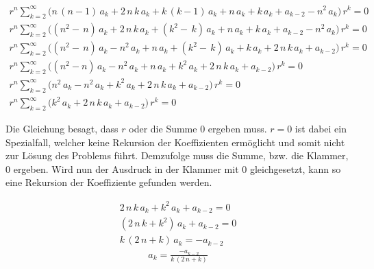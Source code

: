 \begin{align}
	r^n
	\sum_{k=2}^{\infty}
	\biggl(
	n \, \left( n - 1 \right) \, a_k 
	+
	2 \, n \, k \, a_k
	+
	k \, \left( k - 1 \right) \, a_k
	+
	n \, a_k
	+
	k \, a_k
	+
	a_{k - 2}
	-
	n^2 \, a_k
	\biggr)
	\, r^k
	= 0 
	\label{eq:bessel:summe:zusammengefasst}
	\\
	\nonumber
	r^n
	\sum_{k=2}^{\infty}
	\biggl(
	\left( n^2 - \, n \right) \, a_k 
	+
	2 \, n \, k \, a_k
	+
	\left( k^2 - \, k \right) \, a_k
	+
	n \, a_k
	+
	k \, a_k
	+
	a_{k - 2}
	-
	n^2 \, a_k
	\biggr)
	\, r^k
	= 0 
	\\
	\nonumber
	r^n
	\sum_{k=2}^{\infty}
	\biggl(
	\left( n^2 - \, n \right) \, a_k 
	-
	n^2 \, a_k
	+
	n \, a_k
	+
	\left( k^2 - \, k \right) \, a_k
	+
	k \, a_k
	+
	2 \, n \, k \, a_k
	+
	a_{k - 2}
	\biggr)
	\, r^k
	= 0 
	\\
	\nonumber
	r^n
	\sum_{k=2}^{\infty}
	\biggl(
	\left( n^2 - n \right) \, a_k 
	-
	n^2 \, a_k
	+
	n \, a_k
	+
	k^2 \, a_k
	+
	2 \, n \, k \, a_k
	+
	a_{k - 2}
	\biggr)
	\, r^k
	= 0 
	\\
	\nonumber
	r^n
	\sum_{k=2}^{\infty}
	\biggl(
	n^2 \, a_k 
	-
	n^2 \, a_k
	+
	k^2 \, a_k
	+
	2 \, n \, k \, a_k
	+
	a_{k - 2}
	\biggr)
	\, r^k
	= 0 
	\\
	r^n
	\sum_{k=2}^{\infty}
	\biggl(
	k^2 \, a_k
	+
	2 \, n \, k \, a_k
	+
	a_{k - 2}
	\biggr)
	\, r^k
	= 0
	\label{eq:bessel:summe:zusammengefasst:vereinfacht}
\end{align}
\begin{normalsize}%
Die Gleichung  besagt,
dass $r$ oder die Summe $0$ ergeben muss.
$r = 0$ ist dabei ein Spezialfall, welcher keine Rekursion der Koeffizienten erm\"oglicht und somit nicht zur L\"osung des Problems f\"uhrt.
Demzufolge muss die Summe, bzw. die Klammer, $0$ ergeben.
Wird nun der Ausdruck in der Klammer mit $0$ gleichgesetzt,
kann so eine Rekursion der Koeffiziente gefunden werden.
\end{normalsize}
\begin{align*}
	2 \, n \, k \, a_k
	+
	k^2 \, a_k
	+
	a_{k - 2}
	= 0
	\\
	\left(
	2 \, n \, k 
	+
	k^2 
	\right)
	\, a_k
	+
	a_{k - 2}
	= 0 
	\\
	k \,
	\left(
	2 \, n
	+
	k
	\right)
	\, a_k
	= -a_{k - 2}
\end{align*}
\begin{align}
	a_k
	=
	\frac
	{
		-a_{k - 2}
	}{
		k \, \left( 2 \, n + k \right)	
	}
	\label{eq:bessel:koeffizienten:rekursion}
\end{align}
